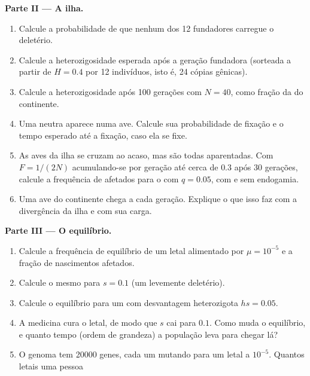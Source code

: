 \begin{problem}
\medskip
\noindent\textbf{Parte II --- A ilha.}
\begin{enumerate}[resume]
  \item Calcule a probabilidade de que nenhum dos 12 fundadores carregue
        o  deletério.
  \item Calcule a heterozigosidade esperada após a geração fundadora
        (sorteada a partir de $H = 0.4$ por 12 indivíduos, isto é, 24
        cópias gênicas).
  \item Calcule a heterozigosidade após 100 gerações com $N =
        40$, como fração da do continente.
  \item Uma  neutra aparece numa ave. Calcule sua
        probabilidade de fixação e o tempo esperado até a fixação, caso
        ela se fixe.
  \item As aves da ilha se cruzam ao acaso, mas são todas aparentadas. Com
        $F = 1/(2N)$ acumulando-se por geração até cerca de $0.3$ após
        30 gerações, calcule a frequência de  afetados
        para o  com $q = 0.05$, com e sem endogamia.
  \item Uma ave do continente chega a cada geração. Explique o que isso
        faz com a divergência da ilha e com sua carga.
\end{enumerate}
\medskip
\noindent\textbf{Parte III --- O equilíbrio.}
\begin{enumerate}[resume]
  \item Calcule a frequência de equilíbrio de um letal  alimentado
        por $\mu = 10^{-5}$ e a fração de nascimentos afetados.
  \item Calcule o mesmo para $s = 0.1$ (um  levemente
        deletério).
  \item Calcule o equilíbrio para um   com
        desvantagem heterozigota $hs = 0.05$.
  \item A medicina cura o letal, de modo que $s$ cai para $0.1$. Como
        muda o equilíbrio, e quanto tempo (ordem de
        grandeza) a população leva para chegar lá?
  \item O genoma tem \num{20000} genes, cada um mutando para um
        letal  a $10^{-5}$. Quantos  letais uma pessoa

\end{enumerate}
\end{problem}
